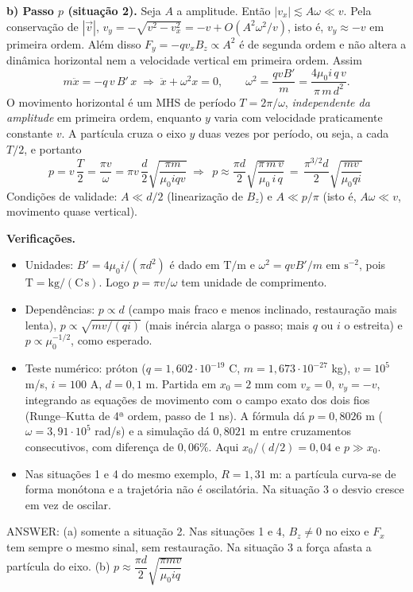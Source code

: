 \documentclass{article}%
\begin{document}
\textbf{b) Passo $p$ (situação 2).} Seja $A$ a amplitude. Então $|v_x|\lesssim A\omega\ll v$. Pela conservação de $|\vec v|$, $v_y=-\sqrt{v^2-v_x^2}=-v+O(A^2\omega^2/v)$, isto é, $v_y\approx -v$ em primeira ordem. Além disso $F_y=-qv_xB_z\propto A^2$ é de segunda ordem e não altera a dinâmica horizontal nem a velocidade vertical em primeira ordem. Assim
\[
m\ddot x=-q\,v\,B'\,x\;\Rightarrow\;\ddot x+\omega^2x=0,\qquad \omega^2=\frac{qvB'}{m}=\frac{4\mu_0 i\,q\,v}{\pi\,m\,d^{2}} .
\]
O movimento horizontal é um MHS de período $T=2\pi/\omega$, \emph{independente da amplitude} em primeira ordem, enquanto $y$ varia com velocidade praticamente constante $v$. A partícula cruza o eixo $y$ duas vezes por período, ou seja, a cada $T/2$, e portanto
\[
p=v\,\frac T2=\frac{\pi v}{\omega}=\pi v\,\frac d2\sqrt{\frac{\pi m}{\mu_0 i q v}}
\;\Longrightarrow\;
\boxed{\,p\approx\frac{\pi d}{2}\sqrt{\frac{\pi\, m\, v}{\mu_0\, i\, q}}\,=\,\frac{\pi^{3/2}d}{2}\sqrt{\frac{mv}{\mu_0 q i}}\,}
\]
Condições de validade: $A\ll d/2$ (linearização de $B_z$) e $A\ll p/\pi$ (isto é, $A\omega\ll v$, movimento quase vertical).

\textbf{Verificações.}
\begin{itemize}
\item Unidades: $B'=4\mu_0 i/(\pi d^2)$ é dado em $\mathrm{T/m}$ e $\omega^2=qvB'/m$ em $\mathrm{s^{-2}}$, pois $\mathrm{T}=\mathrm{kg/(C\,s)}$. Logo $p=\pi v/\omega$ tem unidade de comprimento.
\item Dependências: $p\propto d$ (campo mais fraco e menos inclinado, restauração mais lenta), $p\propto\sqrt{mv/(qi)}$ (mais inércia alarga o passo; mais $q$ ou $i$ o estreita) e $p\propto\mu_0^{-1/2}$, como esperado.
\item Teste numérico: próton ($q=1{,}602\cdot10^{-19}$ C, $m=1{,}673\cdot10^{-27}$ kg), $v=10^5$ m/s, $i=100$ A, $d=0{,}1$ m. Partida em $x_0=2$ mm com $v_x=0$, $v_y=-v$, integrando as equações de movimento com o campo exato dos dois fios (Runge--Kutta de 4ª ordem, passo de 1 ns). A fórmula dá $p=0{,}8026$ m ($\omega=3{,}91\cdot10^{5}$ rad/s) e a simulação dá $0{,}8021$ m entre cruzamentos consecutivos, com diferença de $0{,}06\%$. Aqui $x_0/(d/2)=0{,}04$ e $p\gg x_0$.
\item Nas situações 1 e 4 do mesmo exemplo, $R=1{,}31$ m: a partícula curva-se de forma monótona e a trajetória não é oscilatória. Na situação 3 o desvio cresce em vez de oscilar.
\end{itemize}

ANSWER: (a) somente a situação 2. Nas situações 1 e 4, $B_z\neq0$ no eixo e $F_x$ tem sempre o mesmo sinal, sem restauração. Na situação 3 a força afasta a partícula do eixo. (b) $p\approx\dfrac{\pi d}{2}\sqrt{\dfrac{\pi m v}{\mu_0 i q}}$%
\newpage%
\end{document}
